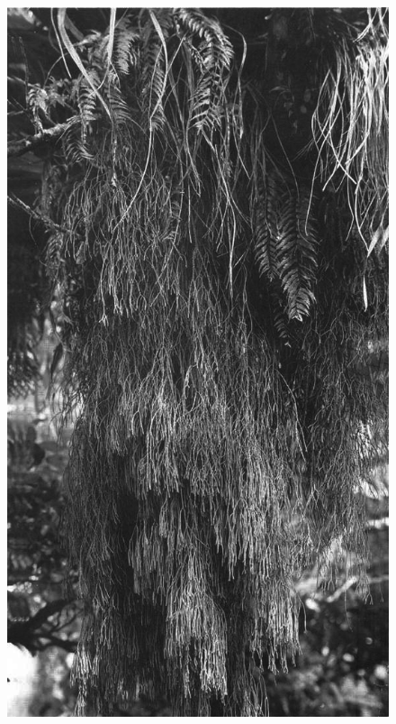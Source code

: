 \begin{figure}[!b]
	\centering
	\begin{minipage}[t]{0.7\textwidth}
		\begin{minipage}[t]{(\textwidth-\fgap) * \real{0.564}}
			\centering
			\includegraphics[width=\textwidth]{graphics/fig_042}

\end{minipage}
\end{minipage}
\end{figure}
